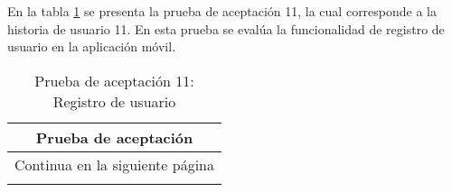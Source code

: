 En la tabla \ref{tab:prueba-11} se presenta la prueba de aceptación 11, la cual corresponde a la historia de usuario 11.
En esta prueba se evalúa la funcionalidad de registro de usuario en la aplicación móvil.

\begin{longtable}{|p{6.7cm}|p{6.7cm}|}
    \caption{Prueba de aceptación 11: Registro de usuario} \label{tab:prueba-11}
    \\
    \hline
    \multicolumn{2}{|c|}{\textbf{Prueba de aceptación}}                                                                                                                                                                                                                                                             \\
    \hline

    \endfirsthead

    \hline
    \endhead

    \hline
    \multicolumn{2}{|c|}{{Continua en la siguiente página}}                                                                                                                                                                                                                                                         \\
    \hline
    \endfoot


\end{longtable}
